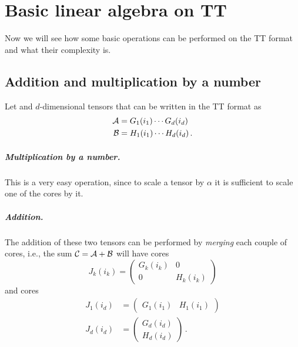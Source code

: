 \chapter{Basic linear algebra on TT}
Now we will see how some basic operations can be performed on the TT format and what their complexity is.

\section{Addition and multiplication by a number}
Let \A and \B $d$-dimensional tensors that can be written in the TT format as
\begin{equation*}
  \begin{split}
    \mathcal{A} &= G_1(i_1) \cdots G_d(i_d)\\
    \mathcal{B} &= H_1(i_1) \cdots H_d(i_d)\, .
  \end{split}
\end{equation*}

\paragraph{Multiplication by a number.}
This is a very easy operation, since to scale a tensor by $\alpha$ it is sufficient to scale one of the cores by it.

\paragraph{Addition.}
The addition of these two tensors can be performed by \emph{merging} each couple of cores, i.e., the sum $\mathcal{C} = \mathcal{A} + \mathcal{B}$ will have  cores
\begin{equation*}
  J_k(i_k) = 
  \begin{pmatrix}
    G_k(i_k) & 0\\
    0 & H_k(i_k)
  \end{pmatrix}
\end{equation*}
and  cores
\begin{equation*}
  \begin{split}
    J_1(i_d) &= 
  \begin{pmatrix}
    G_1(i_1) & H_1(i_1)
  \end{pmatrix}\\
  J_d(i_d) &= 
  \begin{pmatrix}
    G_d(i_d)\\
    H_d(i_d)
  \end{pmatrix}\, .
  \end{split}
\end{equation*}

